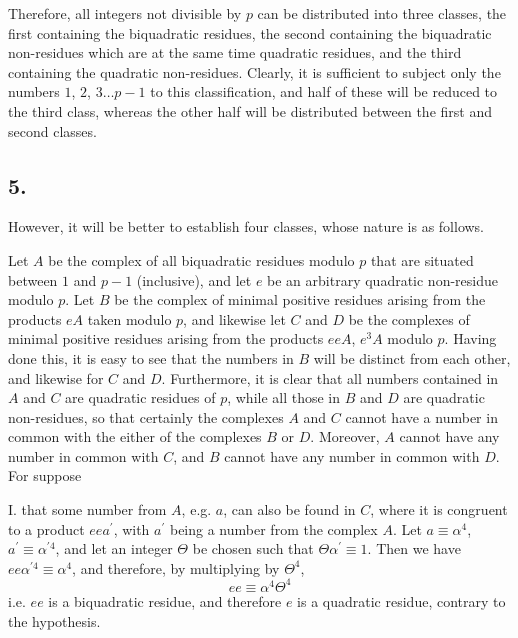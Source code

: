 \documentclass[twoside,12pt]{memoir}
\begin{document}
Therefore, all integers not divisible by \(p\) can be distributed into three classes, the first containing the biquadratic residues, the second containing the biquadratic non-residues which are at the same time quadratic residues, and the third containing the quadratic non-residues. Clearly, it is sufficient to subject only the numbers \(1\), \(2\), \(3 \ldots p-1\) to this classification, and half of these will be reduced to the third class, whereas the other half will be distributed between the first and second classes.

\subsection*{5.}

However, it will be better to establish four classes, whose nature is as follows.

Let \(A\) be the complex of all biquadratic residues modulo \(p\) that are situated between \(1\) and \(p-1\) (inclusive), and let \(e\) be an arbitrary quadratic non-residue modulo \(p\). Let \(B\) be the complex of minimal positive residues arising from the products \(e A\) taken modulo \(p\), and likewise let  \(C\) and \(D\) be the complexes of minimal positive residues arising from the products \(e e A\), \(e^{3} A\) modulo \(p\). Having done this, it is easy to see that the numbers in \(B\) will be distinct from each other, and likewise for \(C\) and \(D\). Furthermore, it is clear that all numbers contained in \(A\) and \(C\) are quadratic residues of \(p\), while all those in \(B\) and \(D\) are quadratic non-residues, so that certainly the complexes \(A\) and \(C\) cannot have a number in common with the either of the complexes \(B\) or \(D\). Moreover, \(A\) cannot have any number in common with \(C\), and \(B\) cannot have any number in common with \(D\). For suppose

I. that some number from \(A\), e{.}g{.} \(a\), can also be found in \(C\), where it is congruent to a product \(e e a^{\prime}\), with \(a^{\prime}\) being a number from the complex \(A\). Let \(a \equiv \alpha^{4}\), \(a^{\prime} \equiv \alpha^{\prime 4}\), and let an integer \(\Theta\) be chosen such that \(\Theta \alpha^{\prime} \equiv 1\). Then we have \(e e \alpha^{\prime 4} \equiv \alpha^{4}\), and therefore, by multiplying by \(\Theta^{4}\),
\[e e \equiv \alpha^{4} \Theta^{4}\]
i{.}e{.} \(ee\) is a biquadratic residue, and therefore \(e\) is a quadratic residue, contrary to the hypothesis.\pagebreak%
\end{document}
